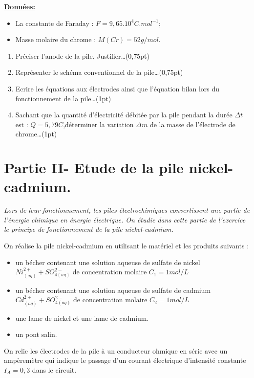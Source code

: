 \documentclass[12pt]{article}
\begin{document}
\textbf{\underline{Données:}}
\begin{itemize}
  \item La constante de Faraday : $F=9,65.10^{4} C.mol^{-1} $;
  \item Masse molaire du chrome : $M(Cr) = 52 g/mol $.
\end{itemize}

\begin{enumerate}
  \item Préciser l’anode de la pile. Justifier\dots(0,75pt)
  \item Représenter le schéma conventionnel de la pile\dots(0,75pt)
  \item Ecrire les équations aux électrodes ainsi que l’équation bilan lors du fonctionnement de la pile\dots(1pt)
  \item Sachant que la quantité d'électricité débitée par la pile pendant la durée $\Delta{t}$ est : $Q=5,79C$,déterminer la variation $\Delta{m}$ de la masse de l’électrode de chrome\dots(1pt)
\end{enumerate}


 \section*{Partie II- Etude de la pile nickel-cadmium.}

\emph{Lors de leur fonctionnement, les piles électrochimiques convertissent une partie de l’énergie
chimique en énergie électrique. On étudie dans cette partie de l’exercice le principe de
fonctionnement de la pile nickel-cadmium.}

On réalise la pile nickel-cadmium en utilisant le matériel et les produits suivants :

\begin{itemize}
  \item un bécher contenant une solution aqueuse de sulfate de nickel $Ni^{2+}_{(aq)} + SO^{2-}_{4(aq)}$ de concentration
molaire $C_1 =1 mol/L$

\item un bécher contenant une solution aqueuse de sulfate de cadmium $Cd^{2+}_{(aq)} + SO^{2-}_{4(aq)}$ de concentration
molaire $C_2 = 1mol/L$
\item une lame de nickel et une lame de cadmium.
\item un pont salin.
\end{itemize}

On relie les électrodes de la pile à un conducteur ohmique en série avec un ampèremètre qui
indique le passage d’un courant électrique d’intensité constante $I_A = 0,3$ dans le circuit.
\end{document}
